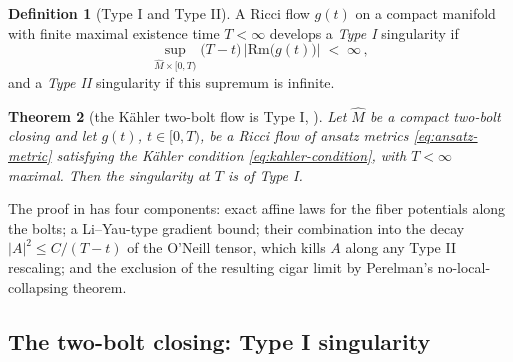 \documentclass[11pt]{amsart}
\theoremstyle{plain}
\numberwithin{equation}{section}
\newtheorem{theorem}{Theorem}[section]
\theoremstyle{definition}
\newtheorem{definition}[theorem]{Definition}
\theoremstyle{remark}
\begin{document}
\begin{definition}[Type I and Type II]\label{def:type-I-II}
	A Ricci flow $g(t)$ on a compact manifold with finite maximal existence time $T < \infty$ develops a \emph{Type I} singularity if
	\[
	\sup_{\widehat{M} \times [0, T)} \big( T - t \big)\, \big| \mathrm{Rm}\big( g(t) \big) \big| \;<\; \infty \,,
	\]
	and a \emph{Type II} singularity if this supremum is infinite. %
\end{definition}

\begin{theorem}[the K\"ahler two-bolt flow is Type I, \cite{FT}]\label{thm:two-bolt-typeI}
	Let $\widehat{M}$ be a compact two-bolt closing and let $g(t)$, $t \in [0, T)$, be a Ricci flow of ansatz metrics \eqref{eq:ansatz-metric} satisfying the Kähler condition \eqref{eq:kahler-condition}, with $T < \infty$ maximal. Then the singularity at $T$ is of Type I.
	
\end{theorem}

The proof in \cite{FT} has four components: exact affine laws for the fiber potentials along the bolts; a Li--Yau-type gradient bound; their combination into the decay $| A |^2 \leq C / ( T - t )$ of the O'Neill tensor, which kills $A$ along any Type II rescaling; and the exclusion of the resulting cigar limit by Perelman's no-local-collapsing theorem. %


\iffalse
\subsection{The two-bolt closing: Type I singularity}\label{subsec:two-bolt}
\end{document}
